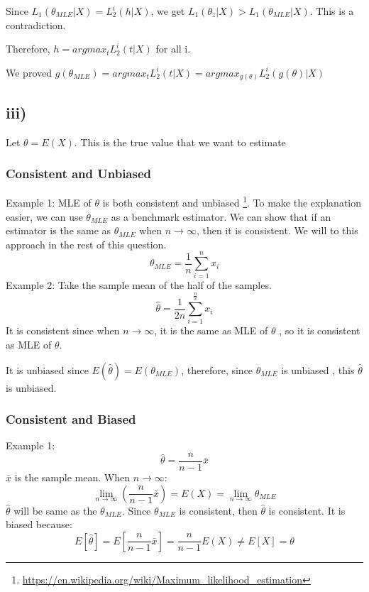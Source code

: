 \documentclass[twoside,11pt]{homework}
\begin{document}
Since $L_{1}(\theta_{MLE}|X) = L_2^i(h|X)$, we get $L_{1}(\theta_z|X) > L_{1}(\theta_{MLE}|X) $. This is a contradiction. 

Therefore, $ h = argmax_{t}L_{2}^{i}(t|X)$ for all i. 

We proved $ g(\theta_{MLE}) = argmax_{t}L_{2}^{i}(t|X) = argmax_{g(\theta)}L_{2}^{i}(g(\theta)|X)$ 

\newpage
\subsection*{iii)}
Let $\theta = E(X)$. This is the true value that we want to estimate
\subsubsection*{Consistent and Unbiased}
Example 1:
MLE of $\theta$ is both consistent and unbiased \footnote{\url{https://en.wikipedia.org/wiki/Maximum_likelihood_estimation}}.
To make the explanation easier, we can use $\theta_{MLE}$ as a benchmark estimator. We can show that if an estimator is the same as $\theta_{MLE}$ when $n \to \infty$, then it is consistent. We will to this approach in the rest of this question.
\begin{equation*}
\theta_{MLE}= \frac{1}{n} \sum_{i=1}^{n} x_{i}
\end{equation*}\noindent Example 2:
Take the sample mean of the half of the samples. 
\begin{equation*}
\hat{\theta} = \frac{1}{2n} \sum_{i=1}^{\frac{n}{2}} x_{i}
\end{equation*}It is consistent since when $n \to \infty$, it is the same as MLE of $\theta$ , so it is consistent as MLE of $ \theta$. 

\noindent It is unbiased since $E(\hat{\theta}) = E(\theta_{MLE})$, therefore, since $\theta_{MLE}$ is unbiased , this $\hat{\theta}$ is unbiased.

\subsubsection*{Consistent and Biased}
Example 1:
\begin{equation*}
\hat{\theta} = \frac{n}{n-1}\bar{x}
\end{equation*}
$\bar{x}$ is the sample mean. 
When $n \to \infty$: 
\begin{equation*}
\lim_{n \to \infty} (\frac{n}{n-1}\bar{x}) = E(X) = \lim_{n \to \infty} \theta_{MLE} 
\end{equation*}
\noindent $\hat{\theta}$ will be same as the $\theta_{MLE}$. Since $\theta_{MLE}$ is consistent, then $\hat{\theta}$ is consistent. 
It is biased because:
\begin{equation*}
E[\hat{\theta}] = E[\frac{n}{n-1}\bar{x}] = \frac{n}{n-1}E(X) \neq E[X] = \theta
\end{equation*}
\end{document}
